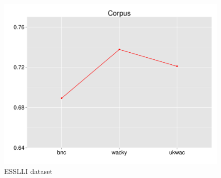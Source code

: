\documentclass[t]{beamer} %
\begin{document}
\begin{frame}
\begin{columns}
\begin{column}{0.5\textwidth}
      \begin{figure}
        \hspace*{-18pt}   
        \includegraphics[scale=0.30]{img/lapesa_esslli_main_corpus}
        \vspace{-10pt}
        \caption{ESSLLI dataset}
      \end{figure}
      
    \end{column}
  \end{columns}  
  
\end{frame}
\end{document}
